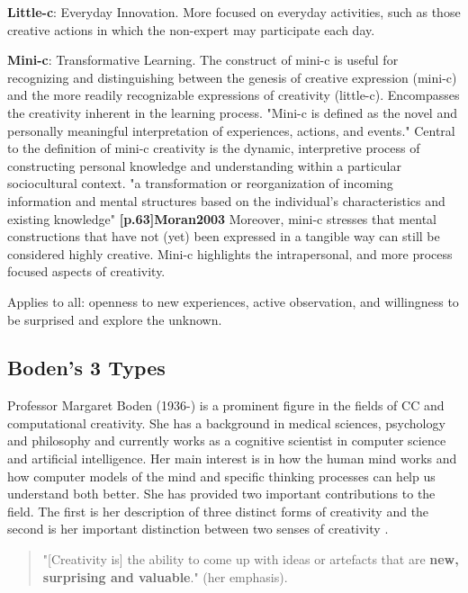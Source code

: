 \textbf{Little-c}: Everyday Innovation. More focused on everyday activities, such as those creative actions in which the non-expert may participate each day.

\textbf{Mini-c}: Transformative Learning. The construct of mini-c is useful for recognizing and distinguishing between the genesis of creative expression (mini-c) and the more readily recognizable expressions of creativity (little-c). Encompasses the creativity inherent in the learning process. "Mini-c is defined as the novel and personally meaningful interpretation of experiences, actions, and events." \citep{Beghetto2007} Central to the definition of mini-c creativity is the dynamic, interpretive process of constructing personal knowledge and understanding within a particular sociocultural context. "a transformation or reorganization of incoming information and mental structures based on the individual's characteristics and existing knowledge" \textbf{[p.63]Moran2003} Moreover, mini-c stresses that mental constructions that have not (yet) been expressed in a tangible way can still be considered highly creative. Mini-c highlights the intrapersonal, and more process focused aspects of creativity.

Applies to all: openness to new experiences, active observation, and willingness to be surprised and explore the unknown.

\subsection{Boden's 3 Types}

Professor Margaret Boden (1936-) is a prominent figure in the fields of CC and computational creativity. She has a background in medical sciences, psychology and philosophy and currently works as a cognitive scientist in computer science and artificial intelligence. Her main interest is in how the human mind works and how computer models of the mind and specific thinking processes can help us understand both better. She has provided two important contributions to the field. The first is her description of three distinct forms of creativity and the second is her important distinction between two senses of creativity \citep{Boden2003}.

\begin{quote}
  "[Creativity is] the ability to come up with ideas or artefacts that are \textbf{new, surprising and valuable}." \citep{Boden2003} (her emphasis).
\end{quote}

